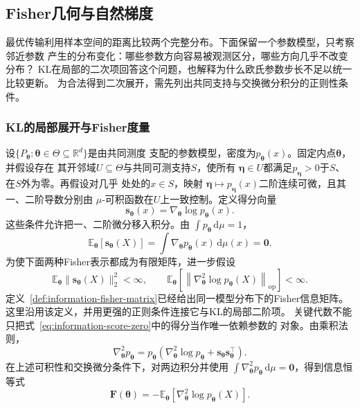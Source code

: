 \subsection{Fisher几何与自然梯度}
\label{sec:information-fisher-geometry}

最优传输利用样本空间的距离比较两个完整分布。下面保留一个参数模型，只考察邻近参数
产生的分布变化：哪些参数方向容易被观测区分，哪些方向几乎不改变分布？
KL在局部的二次项回答这个问题，也解释为什么欧氏参数步长不足以统一比较更新。
为合法得到二次展开，需先列出共同支持与交换微分积分的正则性条件。
\subsubsection{KL的局部展开与Fisher度量}
设\(\{P_{\bm{\theta}}:\bm{\theta}\in\Theta\subseteq\mathbb{R}^d\}\)是由共同测度
支配的参数模型，密度为\(p_{\bm{\theta}}(x)\)。固定内点\(\bm{\theta}\)，并假设存在
其开邻域\(U\subseteq\Theta\)与共同可测支持\(S\)，使所有
\(\bm{\eta}\in U\)都满足\(p_{\bm{\eta}}>0\)于\(S\)、在\(S\)外为零。再假设对几乎
处处的\(x\in S\)，映射
\(\bm{\eta}\mapsto p_{\bm{\eta}}(x)\)二阶连续可微，且其一、二阶导数分别由
\(\mu\)-可积函数在\(U\)上一致控制。定义得分向量
\[
  \bm{s}_{\bm{\theta}}(x)
  =
  \nabla_{\bm{\theta}}\log p_{\bm{\theta}}(x).
\]
这些条件允许把一、二阶微分移入积分。由
\(\int p_{\bm{\theta}}\,\mathrm{d}\mu=1\)，
\begin{equation}
  \mathbb{E}_{\bm{\theta}}[
    \bm{s}_{\bm{\theta}}(X)
  ]
  =
  \int\nabla_{\bm{\theta}}p_{\bm{\theta}}(x)\,\mathrm{d}\mu(x)
  =
  \bm{0}.
  \label{eq:information-score-zero}
\end{equation}
为使下面两种Fisher表示都成为有限矩阵，进一步假设
\[
  \mathbb{E}_{\bm{\theta}}
  \lVert\bm{s}_{\bm{\theta}}(X)\rVert_2^2
  <\infty,
  \qquad
  \mathbb{E}_{\bm{\theta}}\!\left[
    \left\lVert
      \nabla_{\bm{\theta}}^2\log p_{\bm{\theta}}(X)
    \right\rVert_{\mathrm{op}}
  \right]
  <\infty.
\]
定义~\ref{def:information-fisher-matrix}已经给出同一模型分布下的Fisher信息矩阵。这里沿用该定义，并用更强的正则条件连接它与KL的局部二阶项。
关键代数不能只把式~\eqref{eq:information-score-zero}中的得分当作唯一依赖参数的
对象。由乘积法则，
\[
  \nabla_{\bm{\theta}}^2p_{\bm{\theta}}
  =
  p_{\bm{\theta}}\!\left(
    \nabla_{\bm{\theta}}^2\log p_{\bm{\theta}}
    +
    \bm{s}_{\bm{\theta}}\bm{s}_{\bm{\theta}}^{\top}
  \right).
\]
在上述可积性和交换微分条件下，对两边积分并使用
\(\int\nabla_{\bm{\theta}}^2p_{\bm{\theta}}\,\mathrm{d}\mu=\bm0\)，得到信息恒等式
\[
  \bm{F}(\bm{\theta})
  =
  -\mathbb{E}_{\bm{\theta}}\!\left[
    \nabla_{\bm{\theta}}^2
    \log p_{\bm{\theta}}(X)
  \right].
\]
